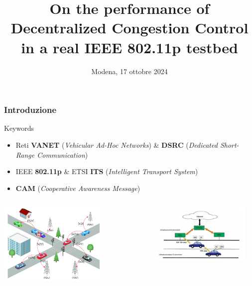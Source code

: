 \documentclass[aspectratio=169]{beamer}
\title[DCC performance in IEEE 802.11p] %
{On the performance of Decentralized Congestion Control in a real IEEE 802.11p testbed}
\institute[] %
{
    \vspace{-1em}
    \fontsize{11}{13}\selectfont \textbf{Relatore: Prof. Carlo Augusto Grazia}
    \and
    Esame di Automotive Connectivity\\
    Corso di Laurea Magistrale in Ingegneria Informatica\\
    Percorso "\textit{Cloud \& Cybersecurity}"
    \and
    Dipartimento di Ingegneria "Enzo Ferrari"\\
    Università degli studi di Modena e Reggio Emilia
}
\date[17 ottobre 2024] %
{Modena, 17 ottobre 2024}
\begin{document}
\frame{\titlepage}

\begin{frame}
    \frametitle{Introduzione}
    \centering
    \vspace{-1em} %
    \begin{block}{Keywords}
        \begin{itemize}
            \item Reti \textbf{VANET} (\textit{Vehicular Ad-Hoc Networks}) \& \textbf{DSRC} (\textit{Dedicated Short-Range Communication})
            \item IEEE \textbf{802.11p} \& ETSI \textbf{ITS} (\textit{Intelligent Transport System})
            \item \textbf{CAM} (\textit{Cooperative Awareness Message})
        \end{itemize}
    \end{block}
    
    \begin{columns}
        \begin{column}{0.5\textwidth}
            \centering
            \includegraphics[width=0.7\textwidth]{vanet.png}
            \label{fig:vanet}
        \end{column}
        \begin{column}{0.5\textwidth}
            \centering
            \includegraphics[width=0.9\textwidth]{routing_vanet.jpeg}
            \label{fig:obu_rsu}
        \end{column}
    \end{columns}
\end{frame}    
\end{document}
